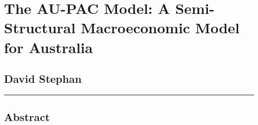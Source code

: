 \documentclass[
]{article}
\author{}
\date{}
\begin{document}
\section{The AU-PAC Model: A Semi-Structural Macroeconomic Model for
Australia}\label{the-au-pac-model-a-semi-structural-macroeconomic-model-for-australia}

\subsection{David Stephan}\label{david-stephan}

\begin{center}\rule{0.5\linewidth}{0.5pt}\end{center}

\subsection{Abstract}\label{abstract}
\end{document}
